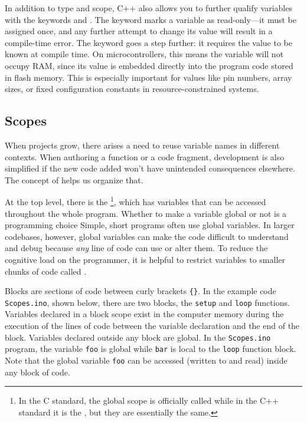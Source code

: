 In addition to type and scope, C++ also allows you to further qualify variables with the keywords  and . 
The  keyword marks a variable as read-only---it must be assigned once, and any further attempt to change its value will result in a compile-time error.
The  keyword goes a step further: it requires the value to be known at compile time. 
On microcontrollers, this means the variable will not occupy RAM, since its value is embedded directly into the program code stored in flash memory. 
This is especially important for values like pin numbers, array sizes, or fixed configuration constants in resource-constrained systems.

\subsection{Scopes}
When projects grow, there arises a need to reuse variable names in different contexts.
When authoring a function or a code fragment, development is also simplified if the new code added won't have unintended consequences elsewhere.
The concept of  helps us organize that.

At the top level, there is the %
\footnote{%
  In the C standard, the global scope is officially called  while in the C++ standard it is the , but they are essentially the same. \cneed
}, which has variables that can be accessed throughout the whole program.
Whether to make a variable global or not is a programming choice
Simple, short programs often use global variables.
In larger codebases, however, global variables can make the code difficult to understand and debug because \emph{any} line of code can use or alter them.
To reduce the cognitive load on the programmer, it is helpful to restrict variables to smaller chunks of code called .

Blocks are sections of code between curly brackets \texttt{\{\}}.
In the example code \texttt{Scopes.ino}, shown below, there are two blocks, the \texttt{setup} and \texttt{loop} functions.
Variables declared in a block scope exist in the computer memory during the execution of the lines of code between the variable declaration and the end of the block.
Variables declared outside any block are global.
In the \texttt{Scopes.ino} program, the variable \texttt{foo} is global while \texttt{bar} is local to the \texttt{loop} function block.
Note that the global variable \texttt{foo} can be accessed (written to and read) inside any block of code.

